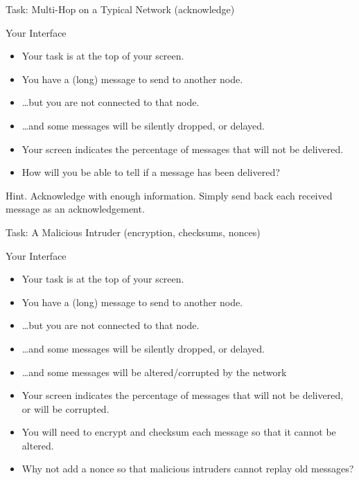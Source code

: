 \documentclass[svgnames]{beamer}
\begin{document}
\begin{frame}{Task: Multi-Hop on a Typical Network (acknowledge)}
\begin{block}{Your Interface}
\begin{itemize}
\item Your task is at the top of your screen.
\item You have a (long) message to send to another node.
\item \dots but you are not connected to that node.
\item \dots and some messages will be \alert{silently} dropped, or delayed.
\item Your screen indicates the percentage of messages that will not be delivered.
\item How will you be able to tell if a message has been delivered?
\end{itemize}
\end{block}
\pause
\begin{alertblock}{Hint. Acknowledge with enough information.}
{Simply send back each received message as an acknowledgement.}
\end{alertblock}

\end{frame}
\begin{frame}{Task: A Malicious Intruder (encryption, checksums, nonces)}
\begin{block}{Your Interface}
\begin{itemize}
\item Your task is at the top of your screen.
\item You have a (long) message to send to another node.
\item \dots but you are not connected to that node.
\item \dots and some messages will be \alert{silently} dropped, or delayed.
\item \dots and some messages will be \alert{altered/corrupted by the network}
\item Your screen indicates the percentage of messages that will not be delivered, or will be corrupted.
\item You will need to \alert{encrypt} and \alert{checksum} each message so that it cannot be altered.
\item Why not add a \alert{nonce} so that malicious intruders cannot replay old messages?
\end{itemize}
\end{block}
\end{frame}
\end{document}

